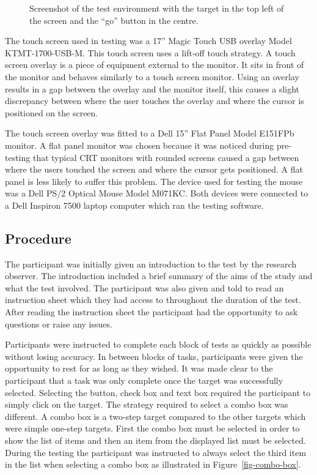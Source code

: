 \documentclass{elsart}
\begin{document}
\begin{figure}
	\centering
	\caption{Screenshot of the test environment with the target in the
	top left of the screen and the ``go'' button in the centre.}
	\label{fig-test-environment}
\end{figure}

The touch screen used in testing was a 17'' Magic Touch USB overlay
Model KTMT-1700-USB-M. This touch screen uses a lift-off touch strategy.
A touch screen overlay is a piece of equipment external to the monitor.
It sits in front of the monitor and behaves similarly to a touch screen
monitor. Using an overlay results in a gap between the overlay and the
monitor itself, this causes a slight discrepancy between where the user
touches the overlay and where the cursor is positioned on the screen.

The touch screen overlay was fitted to a Dell 15'' Flat Panel Model
E151FPb monitor. A flat panel monitor was chosen because it was noticed
during pre-testing that typical CRT monitors with rounded screens caused
a gap between where the users touched the screen and where the cursor
gets positioned. A flat panel is less likely to suffer this problem. The
device used for testing the mouse was a Dell PS/2 Optical Mouse Model
M071KC. Both devices were connected to a Dell Inspiron 7500 laptop
computer which ran the testing software.

\subsection{Procedure}
\label{sec-method-procedure}

The participant was initially given an introduction to the test by the
research observer. The introduction included a brief summary of the aims
of the study and what the test involved. The participant was also given
and told to read an instruction sheet which they had access to
throughout the duration of the test. After reading the instruction sheet
the participant had the opportunity to ask questions or raise any
issues.

Participants were instructed to complete each block of tests as quickly
as possible without losing accuracy. In between blocks of tasks,
participants were given the opportunity to rest for as long as they
wished. It was made clear to the participant that a task was only
complete once the target was successfully selected. Selecting the
button, check box and text box required the participant to simply click
on the target. The strategy required to select a combo box was
different. A combo box is a two-step target compared to the other
targets which were simple one-step targets. First the combo box must be
selected in order to show the list of items and then an item from the
displayed list must be selected. During the testing the participant was
instructed to always select the third item in the list when selecting a
combo box as illustrated in Figure~\ref{fig-combo-box}.
\end{document}
